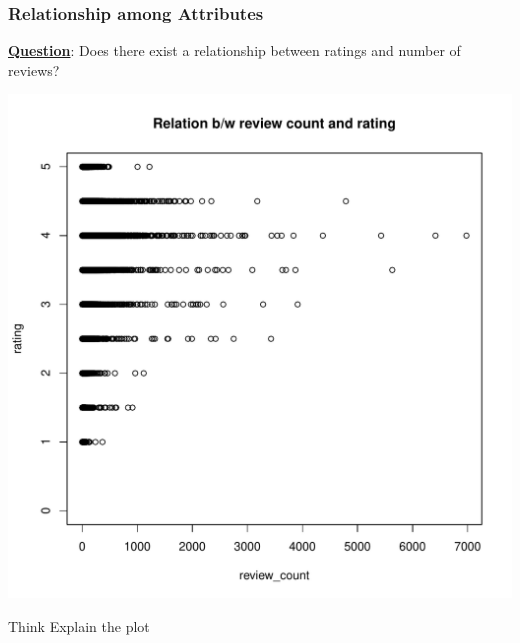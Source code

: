 \newpage
\subsubsection{Relationship among Attributes}
\noindent \textbf{\underline{Question}}: Does there exist a relationship between ratings and number of reviews?
\begin{knitrout}
\color{fgcolor}\begin{kframe}
\begin{alltt}
\hlopt{$}\hlopt{$}
       \hlstd{=} \hlstd{,}
      \hlstd{=} \hlstd{,}  \hlstd{=} \hlstd{)}
\end{alltt}
\end{kframe}
\includegraphics[width=\maxwidth]{figure/corr_Review_Stars-1} 
\begin{kframe}\begin{alltt}
\end{alltt}
\end{kframe}
\end{knitrout}

\begin{DIY}{Think}
\noindent Explain the plot
\end{DIY}

